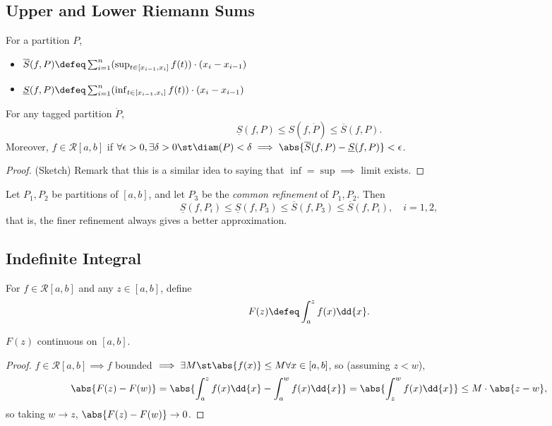 \subsection{Upper and Lower Riemann Sums}

\begin{definition}
    For a partition $P$, \begin{itemize}
        \item $\overline{S}(f, P) \defeq \sum_{i=1}^n (\sup_{t \in [x_{i-1}, x_i]} f(t))\cdot (x_i - x_{i-1})$
        \item  $\underline{S}(f, P) \defeq \sum_{i=1}^n (\inf_{t \in [x_{i-1}, x_i]} f(t))\cdot (x_i - x_{i-1})$
    \end{itemize}
\end{definition}

\begin{proposition}
    For any tagged partition $\dot{P}$, \[
    \underline{S}(f, P) \leq S(f, \dot{P}) \leq \overline{S}(f, P).
    \]
    Moreover, $f \in \mathcal{R}[a, b]$ if $\forall \epsilon > 0, \exists \delta > 0 \st \diam(P) < \delta \implies \abs{\overline{S}(f, P) - \underline{S}(f, P)} < \epsilon$.
\end{proposition}

\begin{proof}(Sketch)
    Remark that this is a similar idea to saying that $\inf = \sup \implies $ limit exists.
\end{proof}

\begin{proposition}
    Let $P_1, P_2$ be partitions of $[a, b]$, and let $P_3$ be the \emph{common refinement} of $P_1, P_2$. Then \[
        \underline{S}(f, P_i) \leq \underline{S}(f, P_3) \leq \overline{S}(f, P_3) \leq \overline{S}(f, P_i), \quad i = 1, 2,
    \]
    that is, the finer refinement always gives a better approximation.
\end{proposition}

\subsection{Indefinite Integral}

\begin{definition}
    For $f \in \mathcal{R}[a, b]$ and any $z \in [a, b]$, define \[
    F(z) \defeq \int_a^z f(x) \dd{x}.    
    \]
\end{definition}

\begin{theorem}
   $ F(z)$ continuous on $[a, b]$.
\end{theorem}
\begin{proof}
    $f \in \mathcal{R}[a, b] \implies f$ bounded $\implies \exists M \st \abs{f(x)} \leq M \forall x \in [a, b]$, so (assuming $z < w$), \[
    \abs{F(z) - F(w)} = \abs{\int_a^z f(x) \dd{x} - \int_a^w f(x) \dd{x}}    = \abs{\int_z^w f(x) \dd{x}} \leq M \cdot \abs{z - w},
    \]
    so taking $w \to z$, $\abs{F(z) - F(w)} \to 0$.
\end{proof}

